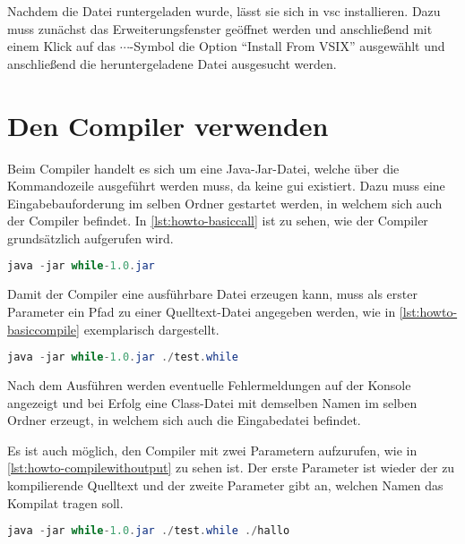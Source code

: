Nachdem die Datei runtergeladen wurde, lässt sie sich in \ac{vsc} installieren. Dazu muss zunächst das Erweiterungsfenster geöffnet werden und anschließend mit einem Klick auf das $\cdots$-Symbol die Option \enquote{Install From VSIX} ausgewählt und anschließend die heruntergeladene Datei ausgesucht werden.


\section{Den Compiler verwenden} \label{sec:kompiler-verwenden}
Beim Compiler handelt es sich um eine Java-Jar-Datei, welche über die Kommandozeile ausgeführt werden muss, da keine \ac{gui} existiert. Dazu muss eine Eingabebauforderung im selben Ordner gestartet werden, in welchem sich auch der Compiler befindet. In \cref{lst:howto-basiccall} ist zu sehen, wie der Compiler grundsätzlich aufgerufen wird.

\begin{lstlisting}[language=java, caption=Grundlegenes Aufrufen des Compilers, label={lst:howto-basiccall}]
	java -jar while-1.0.jar
\end{lstlisting}

Damit der Compiler eine ausführbare Datei erzeugen kann, muss als erster Parameter ein Pfad zu einer Quelltext-Datei angegeben werden, wie in \cref{lst:howto-basiccompile} exemplarisch dargestellt. 

\begin{lstlisting}[language=java, caption=Kompelieren einer Datei, label={lst:howto-basiccompile}]
	java -jar while-1.0.jar ./test.while
\end{lstlisting}

Nach dem Ausführen werden eventuelle Fehlermeldungen auf der Konsole angezeigt und bei Erfolg eine Class-Datei mit demselben Namen im selben Ordner erzeugt, in welchem sich auch die Eingabedatei befindet. 

Es ist auch möglich, den Compiler mit zwei Parametern aufzurufen, wie in \cref{lst:howto-compilewithoutput} zu sehen ist. Der erste Parameter ist wieder der zu kompilierende Quelltext und der zweite Parameter gibt an, welchen Namen das Kompilat tragen soll.

\begin{lstlisting}[language=java, caption=Kompelieren einer Datei mit vorgegebener Ausgabe, label={lst:howto-compilewithoutput}]
	java -jar while-1.0.jar ./test.while ./hallo
\end{lstlisting}


